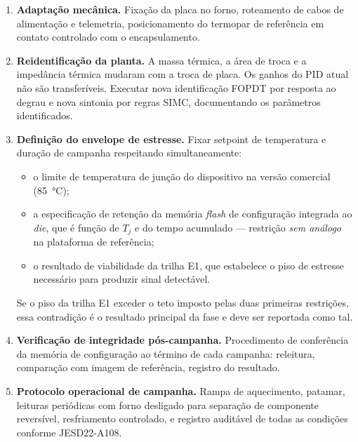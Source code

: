 \documentclass[11pt,a4paper]{article}
\newcommand{\campo}[1]{\vspace{6pt}\noindent{\bfseries\color{lescgray}#1}\par\vspace{2pt}}
\begin{document}
\campo{Tarefas}
\begin{enumerate}
  \item \textbf{Adaptação mecânica.}
        Fixação da placa no forno, roteamento de cabos de alimentação e telemetria,
        posicionamento do termopar de referência em contato controlado com o encapsulamento.

  \item \textbf{Reidentificação da planta.}
        A massa térmica, a área de troca e a impedância térmica mudaram com a troca de
        placa. Os ganhos do PID atual não são transferíveis. Executar nova identificação
        FOPDT por resposta ao degrau e nova sintonia por regras SIMC, documentando os
        parâmetros identificados.

  \item \textbf{Definição do envelope de estresse.}
        Fixar setpoint de temperatura e duração de campanha respeitando simultaneamente:
        \begin{itemize}
          \item o limite de temperatura de junção do dispositivo na versão comercial
                (\SI{85}{\celsius});
          \item a especificação de retenção da memória \emph{flash} de configuração
                integrada ao \emph{die}, que é função de $T_j$ e do tempo acumulado ---
                restrição \emph{sem análogo} na plataforma de referência;
          \item o resultado de viabilidade da trilha E1, que estabelece o piso de
                estresse necessário para produzir sinal detectável.
        \end{itemize}
        Se o piso da trilha E1 exceder o teto imposto pelas duas primeiras restrições,
        essa contradição é o resultado principal da fase e deve ser reportada como tal.

  \item \textbf{Verificação de integridade pós-campanha.}
        Procedimento de conferência da memória de configuração ao término de cada
        campanha: releitura, comparação com imagem de referência, registro do resultado.

  \item \textbf{Protocolo operacional de campanha.}
        Rampa de aquecimento, patamar, leituras periódicas com forno desligado para
        separação de componente reversível, resfriamento controlado, e registro
        auditável de todas as condições conforme JESD22-A108.
\end{enumerate}
\end{document}
